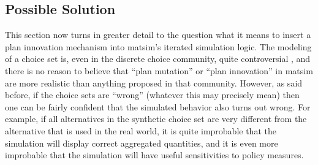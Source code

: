 \subsection{Possible Solution}
\label{sec:Evolution-of-choice:solution}
%
This section now turns in greater detail to the question what it means to insert a plan
innovation mechanism into \gls{matsim}'s iterated simulation logic. The
modeling of a choice set is, even in the discrete choice community,
quite controversial \citep{frejinger-2010}, and there is no reason
to believe that {}``plan mutation'' or {}``plan innovation'' in
\gls{matsim} are more realistic than anything proposed in that community.
However, as said before, if the choice sets are {}``wrong'' (whatever
this may precisely mean) then one can be fairly confident that the
simulated behavior also turns out wrong.
%
For example, if all alternatives in the synthetic choice set are very different from the alternative that is used in the real world, it is quite improbable that the simulation will display correct aggregated quantities, and it is even more improbable that the simulation will have useful sensitivities to policy measures.


